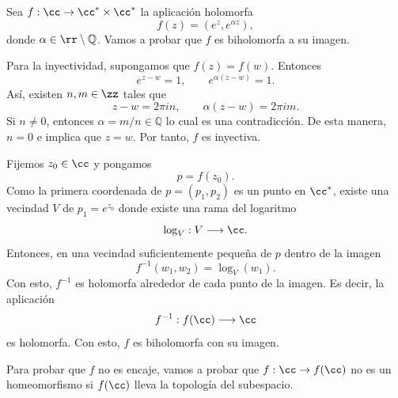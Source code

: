 	\begin{example}
		Sea $f:\cc\to\cc^*\times\cc^*$ la aplicación holomorfa
		\begin{equation*}
			f(z)=(e^z,e^{\alpha z}),
		\end{equation*}
		donde $\alpha\in\rr\setminus\mathbb{Q}$. Vamos a probar que $f$ es biholomorfa a su imagen. 
		
		Para la inyectividad, supongamos que $f(z)=f(w)$. Entonces
		\begin{equation*}
			e^{z-w}=1,\qquad e^{\alpha(z-w)}=1.
		\end{equation*}
		Así, existen $n,m\in \zz$ tales que
		\begin{equation*}
			z-w=2\pi i n,\qquad \alpha(z-w)=2\pi im.
		\end{equation*}
		Si $n\neq 0$, entonces $\alpha=m/n\in\mathbb{Q}$ lo cual es una contradicción. De esta manera, $n=0$ e implica que $z=w$. Por tanto, $f$ es inyectiva.
		
		Fijemos $z_0\in\cc$ y pongamos
		\begin{equation*}
			p=f(z_0).
		\end{equation*}
		Como la primera coordenada de $p=(p_1,p_2)$ es un punto en $\cc^*$, existe una vecindad $V$ de $p_1=e^{z_0}$ donde existe una rama del logaritmo
		\begin{equation*}
			\log_V:V\longrightarrow\cc.
		\end{equation*}
		Entonces, en una vecindad suficientemente pequeña de $p$ dentro de la imagen
		\begin{equation*}
			f^{-1}(w_1,w_2)=\log_V(w_1).
		\end{equation*}
		Con esto, $f^{-1}$ es holomorfa alrededor de cada punto de la imagen. Es decir, la aplicación
		\begin{equation*}
			f^{-1}:f(\cc)\longrightarrow\cc
		\end{equation*}
		es holomorfa. Con esto, $f$ es biholomorfa con su imagen. 
		
		Para probar que $f$ no es encaje, vamos a probar que $f:\cc\to f(\cc)$ no es un homeomorfismo si $f(\cc)$ lleva la topología del subespacio. 
		

\end{example}

